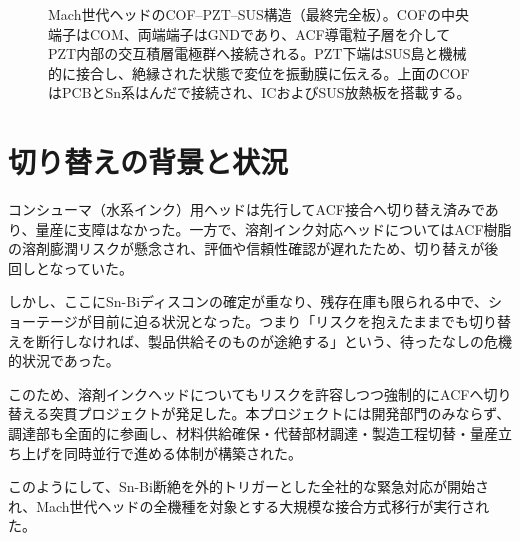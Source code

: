 \documentclass[conference]{IEEEtran}
\begin{document}
\begin{figure*}[t]
\caption{Mach世代ヘッドのCOF–PZT–SUS構造（最終完全板）。COFの中央端子はCOM、両端端子はGNDであり、ACF導電粒子層を介してPZT内部の交互積層電極群へ接続される。PZT下端はSUS島と機械的に接合し、絶縁された状態で変位を振動膜に伝える。上面のCOFはPCBとSn系はんだで接続され、ICおよびSUS放熱板を搭載する。}
\label{fig:mach_complete}
\end{figure*}

\section{切り替えの背景と状況}
コンシューマ（水系インク）用ヘッドは先行してACF接合へ切り替え済みであり、量産に支障はなかった。一方で、溶剤インク対応ヘッドについてはACF樹脂の溶剤膨潤リスクが懸念され、評価や信頼性確認が遅れたため、切り替えが後回しとなっていた。  

しかし、ここにSn-Biディスコンの確定が重なり、残存在庫も限られる中で、ショーテージが目前に迫る状況となった。つまり「リスクを抱えたままでも切り替えを断行しなければ、製品供給そのものが途絶する」という、待ったなしの危機的状況であった。  

このため、溶剤インクヘッドについてもリスクを許容しつつ強制的にACFへ切り替える突貫プロジェクトが発足した。本プロジェクトには開発部門のみならず、調達部も全面的に参画し、材料供給確保・代替部材調達・製造工程切替・量産立ち上げを同時並行で進める体制が構築された。  

このようにして、Sn-Bi断絶を外的トリガーとした全社的な緊急対応が開始され、Mach世代ヘッドの全機種を対象とする大規模な接合方式移行が実行された。
\end{document}
